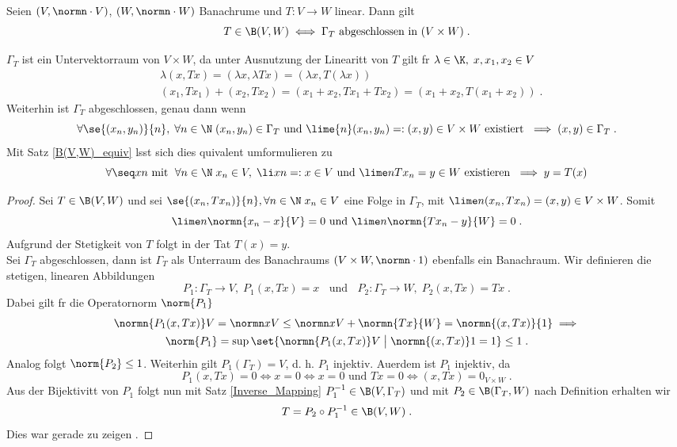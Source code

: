 \begin{theorem}
Seien \((V,\normn\cdot V)\), \((W,\normn\cdot W)\) Banachr\as ume und \(T:V\to W\) linear. Dann gilt
\[T \in \B(V,W) \iff \Gamma_T \text{ abgeschlossen in }(V\times W)\;.\]
\label{closed_graph}
\end{theorem}
\begin{rem}
	\(\Gamma_T\) ist ein Untervektorraum von \(V\times W\), da unter Ausnutzung der Linearit\as t von $T$ gilt f\us r \(\lambda \in \K,\; x, x_1, x_2 \in V\)
	\begin{align*}
		& \lambda (x, Tx) = (\lambda x, \lambda Tx) = (\lambda x, T(\lambda x)) \\
		& (x_1, Tx_1) + (x_2, Tx_2) = (x_1 + x_2, Tx_1 + Tx_2) = (x_1 + x_2, T(x_1 + x_2))\;.
	\end{align*}
	Weiterhin ist \(\Gamma_T\) abgeschlossen, genau dann wenn 
	\[\forall \se{(x_n, y_n)}{n},\;\forall n\in\N \;(x_n, y_n) \in \Gamma_T \text{ und } \lime{n} (x_n, y_n) =:(x,y) \in V\times W \text{ existiert } \implies (x,y) \in \Gamma_T\;.\]
	Mit Satz \ref{B(V,W)_equiv} l\as sst sich dies \as quivalent umformulieren zu
	\[\forall \seq xn \text{ mit }\;\forall n\in \N\; x_n \in V,\;\li xn =: x \in V  \text{ und } \lime n {Tx_n} = y \in W\text{ existieren } \implies y = T(x)\]
\end{rem}
\begin{proof}
	\happybegin
	\forw Sei \(T\in \B(V,W)\) und sei \(\se{(x_n, Tx_n)}{n}, \forall n\in \N\; x_n \in V\) eine Folge in \(\Gamma_T\), mit \(\lime n (x_n, Tx_n) = (x,y) \in V\times W\).  Somit 
	\[\lime n\normn{x_n - x}{V}  = 0 \text{ und } \lime n \normn{Tx_n - y}{W} = 0\;.\]
	Aufgrund der Stetigkeit von $T$ folgt in der Tat \(T(x) = y\).\\
	\backw Sei \(\Gamma_T\) abgeschlossen, dann ist \(\Gamma_T\) als Unterraum des Banachraums \((V\times W,\normn\cdot 1)\) ebenfalls ein Banachraum. Wir definieren die stetigen, linearen Abbildungen
	\[P_1: \Gamma_T \to V,\; P_1(x,Tx) = x \;\;\text{ und }\;\; P_2: \Gamma_T\to W,\; P_2(x,Tx) = Tx\;.\]
	Dabei gilt f\us r die Operatornorm $\norm{P_1}$
	\begin{multline*}
	\normn{P_1(x,Tx)}V = \normn xV \leq \normn xV + \normn{Tx}{W} = \normn{(x,Tx)}{1} \implies \\ \norm{P_1} = \sup \set{ \normn{P_1(x,Tx)}V\;\big\vert\;\normn{(x,Tx)}1 = 1}\leq 1\;.
	\end{multline*}
	Analog folgt \(\norm{P_2} \leq 1\). Weiterhin gilt \(P_1(\Gamma_T) = V\), d. h. $P_1$ injektiv. Au\s erdem ist $P_1$ injektiv, da
	\[P_1(x,Tx) = 0 \iff x = 0 \iff x = 0 \text{ und } Tx = 0 \iff (x,Tx) = 0_{V\times W}\;.\]
	Aus der Bijektivit\as t von $P_1$ folgt nun mit Satz \ref{Inverse_Mapping} \(P_1^{-1} \in \B(V,\Gamma_T)\) und mit \(P_2 \in \B(\Gamma_T, W)\) nach Definition erhalten wir 
	\[T = P_2 \circ P_1^{-1} \in \B(V,W)\;.\]
	Dies war  gerade zu zeigen \happyend.
\end{proof}

